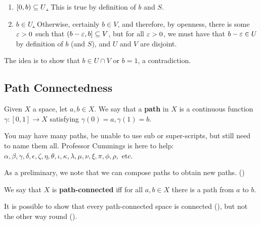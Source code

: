 \begin{boxexample}
\begin{enumerate}
        \item \underline{$\left[0, b\right) \subseteq U$.} This is true by definition of $b$ and $S$.

        \item \underline{$b \in U$.} Otherwise, certainly $b \in V$, and therefore, by openness, there is some $\varepsilon > 0$ such that $\left(b - \varepsilon, b\right] \subseteq V$, but for all $\varepsilon > 0$, we must have that $b - \varepsilon \in U$ by definition of $b$ (and $S$), and $U$ and $V$ are disjoint.
    \end{enumerate}
    The idea is to show that $b \in U \cap V$ or $b = 1$, a contradiction. \sorry
\end{boxexample}


\subsection{Path Connectedness}

\begin{boxdefinition}[Path]
    Given $X$ a space, let $a,b\in X$. We say that a \textbf{path} in $X$ is a continuous function $\gamma:[0,1]\to X$ satisfying $\gamma(0)=a, \gamma(1)=b$.
\end{boxdefinition}

\begin{remark}
    You may have many paths, be unable to use sub or super-scripts, but still need to name them all. Professor Cummings is here to help: $\alpha, \beta, \gamma, \delta, \epsilon,\zeta, \eta, \theta, \iota, \kappa, \lambda, \mu, \nu, \xi, \pi, \phi, \rho,$ etc.
\end{remark}

As a preliminary, we note that we can compose paths to obtain new paths. (\sorry)

\begin{boxdefinition}
    We say that $X$ is \textbf{path-connected} iff for all $a,b\in X$ there is a path from $a$ to $b$.
\end{boxdefinition}


It is possible to show that every path-connected space is connected (\sorry), but not the other way round (\sorry).